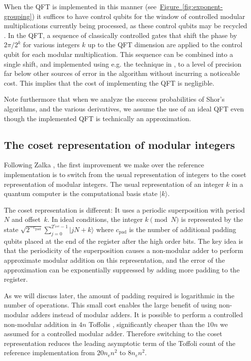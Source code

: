 \documentclass[a4paper, onecolumn, accepted=2021-03-29]{quantumarticle}
\newcommand{\fig}[1]{\hyperref[fig:#1]{Figure~\ref*{fig:#1}}}
\newcommand{\lenexp}{{n_e}}
\newcommand{\gpad}{{c_{\text{pad}}}}
\begin{document}
When the QFT is implemented in this manner (see~\fig{exponent-grouping}) it suffices to have control qubits for the window of controlled modular multiplications currently being processed, as these control qubits may be recycled \cite{mosca1999recycle, parker2000recycle}. In the QFT, a sequence of classically controlled gates that shift the phase by $2\pi/2^k$ for various integers $k$ up to the QFT dimension are applied to the control qubit for each modular multiplication.
This sequence can be combined into a single shift, and implemented using e.g. the technique in \cite{bocharov2015rus}, to a level of precision far below other sources of error in the algorithm without incurring a noticeable cost. This implies that the cost of implementing the QFT is negligible.

Note furthermore that when we analyze the success probabilities of Shor's algorithms, and the various derivatives, we assume the use of an ideal QFT even though the implemented QFT is technically an approximation.

\subsection{The coset representation of modular integers}

Following Zalka \cite{zalka2006pure}, the first improvement we make over the reference implementation is to switch from the usual representation of integers to the coset representation of modular integers.
The usual representation of an integer $k$ in a quantum computer is the computational basis state $|k\rangle$.

The coset representation is different: It uses a periodic superposition with period~$N$ and offset~$k$.
In ideal conditions, the integer $k \pmod{N}$ is represented by the state $\sqrt{2^{-\gpad}} \sum_{j=0}^{2^\gpad-1} |jN + k\rangle$ where $\gpad$ is the number of additional padding qubits placed at the end of the register after the high order bits.
The key idea is that the periodicity of the superposition causes a non-modular adder to perform approximate modular addition on this representation, and the error of the approximation can be exponentially suppressed by adding more padding to the register.

As we will discuss later, the amount of padding required is logarithmic in the number of operations.
This small cost enables the large benefit of using non-modular adders instead of modular adders.
It is possible to perform a controlled non-modular addition in $4n$ Toffolis \cite{cuccaro2004adder, gidney2018addition}, significantly cheaper than the $10n$ we assumed for a controlled modular adder.
Therefore switching to the coset representation reduces the leading asymptotic term of the Toffoli count of the reference implementation from $20 \lenexp n^2$ to $8 \lenexp n^2$.
\end{document}
